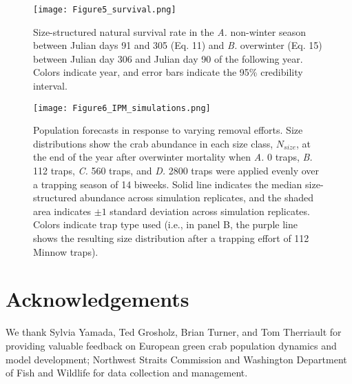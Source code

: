 \documentclass{article}
\begin{document}
\begin{figure}[H]
    \centering
    \texttt{[image: Figure5\_survival.png]}
    \caption{Size-structured natural survival rate in the \textit{A.} non-winter season between Julian days 91 and 305 (Eq. 11) and \textit{B.} overwinter (Eq. 15) between Julian day 306 and Julian day 90 of the following year. Colors indicate year, and error bars indicate the 95\% credibility interval.}
\end{figure}

\begin{figure}[H]
    \centering
    \texttt{[image: Figure6\_IPM\_simulations.png]}
    \caption{Population forecasts in response to varying removal efforts. Size distributions show the crab abundance in each size class, $N_{size}$, at the end of the year after overwinter mortality when \textit{A.} 0 traps, \textit{B.} 112 traps, \textit{C.} 560 traps, and \textit{D.} 2800 traps were applied evenly over a trapping season of 14 biweeks. Solid line indicates the median size-structured abundance across simulation replicates, and the shaded area indicates $\pm1$ standard deviation across simulation replicates. Colors indicate trap type used (i.e., in panel B, the purple line shows the resulting size distribution after a trapping effort of 112 Minnow traps).}
\end{figure}

\section{Acknowledgements}

We thank Sylvia Yamada, Ted Grosholz, Brian Turner, and Tom Therriault for providing valuable feedback on European green crab population dynamics and model development; Northwest Straits Commission and Washington Department of Fish and Wildlife for data collection and management.  

\printbibliography[]
\end{document}
